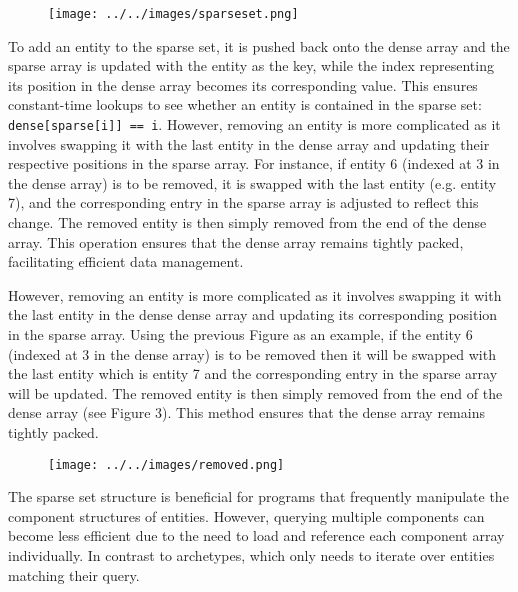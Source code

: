 \documentclass[openany, amssymb, psamsfonts]{amsart}
\theoremstyle{definition}
\numberwithin{equation}{section}
\begin{document}
\begin{figure}[htbp]
\centering
\texttt{[image: ../../images/sparseset.png]}\label{Fig 2: Sparse Set}
\end{figure}


To add an entity to the sparse set, it is pushed back onto the dense array and the sparse 
array is updated with the entity as the key, while the index representing its position 
in the dense array becomes its corresponding value. This ensures constant-time lookups 
to see whether an entity is contained in the sparse set: \texttt{dense[sparse[i]] == i}. However, removing an entity is more complicated as it involves swapping it with the last entity in the dense array and updating their respective positions in the sparse array. For instance, if entity 6 (indexed at 3 in the dense array) is to be removed, it is swapped with the last entity (e.g. entity 7), and the corresponding entry in the sparse array is adjusted to reflect this change. The removed entity is then simply removed from the end of the dense array. This operation ensures 
that the dense array remains tightly packed, facilitating efficient data management.

However, removing an entity is more complicated as it involves swapping it with the 
last entity in the dense dense array and updating its corresponding position in the 
sparse array. Using the previous Figure as an example, if the entity 6 (indexed at 3 
in the dense array) is to be removed then it will be swapped with the last entity which 
is entity 7 and the corresponding entry in the sparse array will be updated. The removed 
entity is then simply removed from the end of the dense array (see Figure 3). 
This method ensures that the dense array remains tightly packed.\cite{Caini}

\begin{figure}[htbp]
\centering
\texttt{[image: ../../images/removed.png]}\label{Fig 3: Removing Entity}
\end{figure}

The sparse set structure is beneficial for programs that frequently manipulate the component structures of entities. However, querying multiple components can become less efficient due to the need to load and reference each component array individually. In contrast to archetypes, which only needs to iterate over entities matching their query. 
\end{document}
